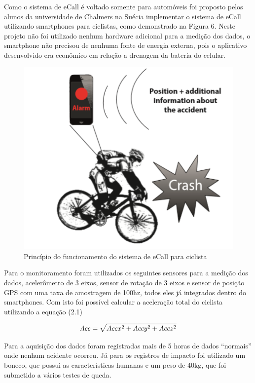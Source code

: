 Como o sistema de eCall é voltado somente para automóveis foi proposto pelos alunos da universidade de Chalmers na Suécia implementar o sistema de eCall utilizando smartphones para ciclistas, como demonstrado na Figura 6.  Neste projeto não foi utilizado nenhum hardware adicional para a medição dos dados, o smartphone não precisou de nenhuma fonte de energia externa, pois o aplicativo desenvolvido era econômico em relação a drenagem da bateria do celular.



\begin{figure}[H]

 \caption{Princípio do funcionamento do sistema de eCall para ciclista}
 \centering
  \includegraphics[width=150mm]{images/Cap2/images.png}
  
\end{figure}


Para o monitoramento foram utilizados os seguintes sensores para a medição dos dados, acelerômetro de 3 eixos, sensor de rotação de 3 eixos e sensor de posição GPS com uma taxa de amostragem de 100hz, todos eles já integrados dentro do smartphones. Com isto foi possível calcular a aceleração total do ciclista utilizando a equação (2.1)

\begin{equation}
\centering
    \mathit{Acc} = \sqrt{Accx^2 + Accy^2 + Accz^2}
\end{equation}


Para a aquisição dos dados foram registradas mais de 5 horas de dados “normais” onde nenhum acidente ocorreu. Já para os registros de impacto foi utilizado um boneco, que possui as características humanas e um peso de 40kg, que foi submetido a vários testes de queda.

